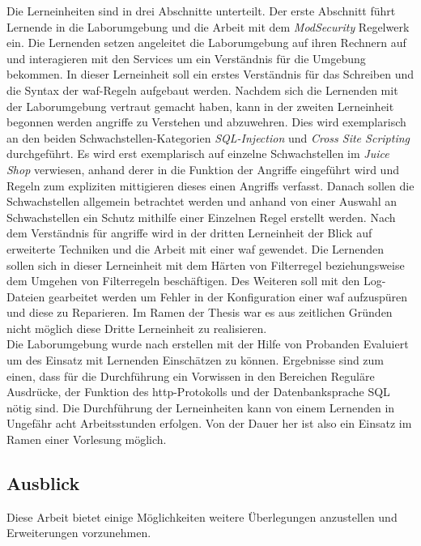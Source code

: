 Die Lerneinheiten sind in drei Abschnitte unterteilt.
Der erste Abschnitt führt Lernende in die Laborumgebung und die Arbeit mit dem \textit{ModSecurity} Regelwerk ein.
Die Lernenden setzen angeleitet die Laborumgebung auf ihren Rechnern auf und interagieren mit den Services um ein Verständnis für die Umgebung bekommen.
In dieser Lerneinheit soll ein erstes Verständnis für das Schreiben und die Syntax der \ac{waf}-Regeln aufgebaut werden.
Nachdem sich die Lernenden mit der Laborumgebung vertraut gemacht haben, kann in der zweiten Lerneinheit begonnen werden angriffe zu Verstehen und abzuwehren.
Dies wird exemplarisch an den beiden Schwachstellen-Kategorien \textit{SQL-Injection} und \textit{Cross Site Scripting} durchgeführt.
Es wird erst exemplarisch auf einzelne Schwachstellen im \textit{Juice Shop} verwiesen, anhand derer in die Funktion der Angriffe eingeführt wird und Regeln zum expliziten mittigieren dieses einen Angriffs verfasst.
Danach sollen die Schwachstellen allgemein betrachtet werden und anhand von einer Auswahl an Schwachstellen ein Schutz mithilfe einer Einzelnen Regel erstellt werden.
Nach dem Verständnis für angriffe wird in der dritten Lerneinheit der Blick auf erweiterte Techniken und die Arbeit mit einer \ac{waf} gewendet.
Die Lernenden sollen sich in dieser Lerneinheit mit dem Härten von Filterregel beziehungsweise dem Umgehen von Filterregeln beschäftigen.
Des Weiteren soll mit den Log-Dateien gearbeitet werden um Fehler in der Konfiguration einer \ac{waf} aufzuspüren und diese zu Reparieren.
Im Ramen der Thesis war es aus zeitlichen Gründen nicht möglich diese Dritte Lerneinheit zu realisieren.\\

Die Laborumgebung wurde nach erstellen mit der Hilfe von Probanden Evaluiert um des Einsatz mit Lernenden Einschätzen zu können.
Ergebnisse sind zum einen, dass für die Durchführung ein Vorwissen in den Bereichen Reguläre Ausdrücke, der Funktion des \ac{http}-Protokolls und der Datenbanksprache SQL nötig sind.
Die Durchführung der Lerneinheiten kann von einem Lernenden in Ungefähr acht Arbeitsstunden erfolgen.
Von der Dauer her ist also ein Einsatz im Ramen einer Vorlesung möglich.

\subsection{Ausblick}

Diese Arbeit bietet einige Möglichkeiten weitere Überlegungen anzustellen und Erweiterungen vorzunehmen.


